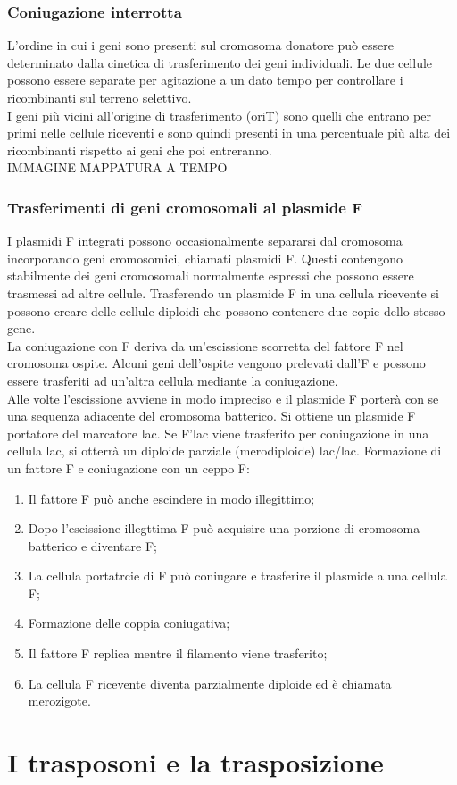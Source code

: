 \subsubsection{Coniugazione interrotta}
L'ordine in cui i geni sono presenti sul cromosoma donatore può essere determinato dalla cinetica di trasferimento dei geni individuali. Le due cellule possono essere separate per agitazione a un dato tempo per controllare i ricombinanti sul terreno selettivo.
\\I geni più vicini all'origine di trasferimento (oriT) sono quelli che entrano per primi nelle cellule riceventi e sono quindi presenti in una percentuale più alta dei ricombinanti rispetto ai geni che poi entreranno. 
\\IMMAGINE MAPPATURA A TEMPO 
\subsubsection{Trasferimenti di geni cromosomali al plasmide F}
I plasmidi F integrati possono occasionalmente separarsi dal cromosoma incorporando geni cromosomici, chiamati plasmidi F. Questi contengono stabilmente dei geni cromosomali normalmente espressi che possono essere trasmessi ad altre cellule. Trasferendo un plasmide F in una cellula ricevente si possono creare delle cellule diploidi che possono contenere due copie dello stesso gene. 
\\La coniugazione con F deriva da un'escissione scorretta del fattore F nel cromosoma ospite. Alcuni geni dell'ospite vengono prelevati dall'F e possono essere trasferiti ad un'altra cellula mediante la coniugazione. 
\\Alle volte l'escissione avviene in modo impreciso e il plasmide F porterà con se una sequenza adiacente del cromosoma batterico. Si ottiene un plasmide F portatore del marcatore lac\ap{+}. Se F'lac\ap{+} viene trasferito per coniugazione in una cellula lac\ap{-}, si otterrà un diploide parziale (merodiploide) lac\ap{+}/lac\ap{-}.
Formazione di un fattore F e coniugazione con un ceppo F\ap{-}:
\begin{enumerate}
    \item Il fattore F può anche escindere in modo illegittimo; 
    \item Dopo l'escissione illegttima F può acquisire una porzione di cromosoma batterico e diventare F;
    \item La cellula portatrcie di F può coniugare e trasferire il plasmide a una cellula F;
    \item Formazione delle coppia coniugativa;
    \item Il fattore F replica mentre il filamento viene trasferito;
    \item La cellula F ricevente diventa parzialmente diploide ed è chiamata merozigote. 
\end{enumerate}
\section{I trasposoni e la trasposizione}
